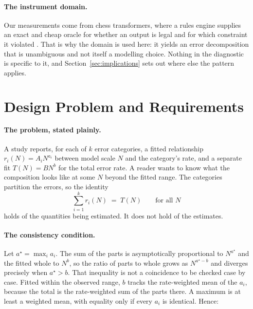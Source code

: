 \documentclass[11pt]{article}
\begin{document}
\paragraph{The instrument domain.}
Our measurements come from chess transformers, where a rules engine supplies an
exact and cheap oracle for whether an output is legal and for which constraint it
violated \citep{karvonen2024emergent}. That is why the domain is used here: it
yields an error decomposition that is unambiguous and not itself a modelling
choice. Nothing in the diagnostic is specific to it, and
Section~\ref{sec:implications} sets out where else the pattern applies.

\section{Design Problem and Requirements}
\label{sec:design}

\paragraph{The problem, stated plainly.}
A study reports, for each of $k$ error categories, a fitted relationship
$r_i(N) = A_i N^{a_i}$ between model scale $N$ and the category's rate, and a
separate fit $T(N) = B N^{b}$ for the total error rate. A reader wants to know what
the composition looks like at some $N$ beyond the fitted range. The categories
partition the errors, so the identity
\begin{equation}
\sum_{i=1}^{k} r_i(N) \;=\; T(N) \qquad \text{for all } N
\label{eq:closure}
\end{equation}
holds of the quantities being estimated. It does not hold of the estimates.

\paragraph{The consistency condition.}
Let $a^\star = \max_i a_i$. The sum of the parts is asymptotically proportional to
$N^{a^\star}$ and the fitted whole to $N^{b}$, so the ratio of parts to whole grows
as $N^{a^\star - b}$ and diverges precisely when $a^\star > b$. That inequality is
not a coincidence to be checked case by case. Fitted within the observed range, $b$
tracks the rate-weighted mean of the $a_i$, because the total is the rate-weighted
sum of the parts there. A maximum is at least a weighted mean, with equality only
if every $a_i$ is identical. Hence:
\end{document}
